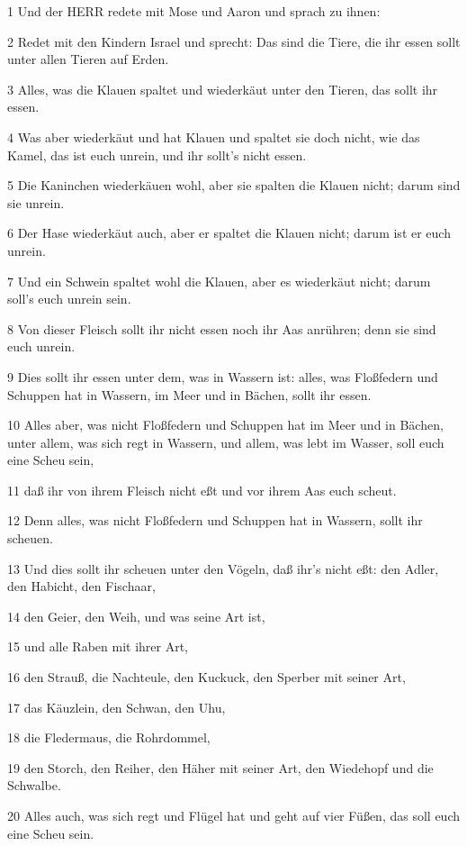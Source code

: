 \par 1 Und der HERR redete mit Mose und Aaron und sprach zu ihnen:
\par 2 Redet mit den Kindern Israel und sprecht: Das sind die Tiere, die ihr essen sollt unter allen Tieren auf Erden.
\par 3 Alles, was die Klauen spaltet und wiederkäut unter den Tieren, das sollt ihr essen.
\par 4 Was aber wiederkäut und hat Klauen und spaltet sie doch nicht, wie das Kamel, das ist euch unrein, und ihr sollt's nicht essen.
\par 5 Die Kaninchen wiederkäuen wohl, aber sie spalten die Klauen nicht; darum sind sie unrein.
\par 6 Der Hase wiederkäut auch, aber er spaltet die Klauen nicht; darum ist er euch unrein.
\par 7 Und ein Schwein spaltet wohl die Klauen, aber es wiederkäut nicht; darum soll's euch unrein sein.
\par 8 Von dieser Fleisch sollt ihr nicht essen noch ihr Aas anrühren; denn sie sind euch unrein.
\par 9 Dies sollt ihr essen unter dem, was in Wassern ist: alles, was Floßfedern und Schuppen hat in Wassern, im Meer und in Bächen, sollt ihr essen.
\par 10 Alles aber, was nicht Floßfedern und Schuppen hat im Meer und in Bächen, unter allem, was sich regt in Wassern, und allem, was lebt im Wasser, soll euch eine Scheu sein,
\par 11 daß ihr von ihrem Fleisch nicht eßt und vor ihrem Aas euch scheut.
\par 12 Denn alles, was nicht Floßfedern und Schuppen hat in Wassern, sollt ihr scheuen.
\par 13 Und dies sollt ihr scheuen unter den Vögeln, daß ihr's nicht eßt: den Adler, den Habicht, den Fischaar,
\par 14 den Geier, den Weih, und was seine Art ist,
\par 15 und alle Raben mit ihrer Art,
\par 16 den Strauß, die Nachteule, den Kuckuck, den Sperber mit seiner Art,
\par 17 das Käuzlein, den Schwan, den Uhu,
\par 18 die Fledermaus, die Rohrdommel,
\par 19 den Storch, den Reiher, den Häher mit seiner Art, den Wiedehopf und die Schwalbe.
\par 20 Alles auch, was sich regt und Flügel hat und geht auf vier Füßen, das soll euch eine Scheu sein.
